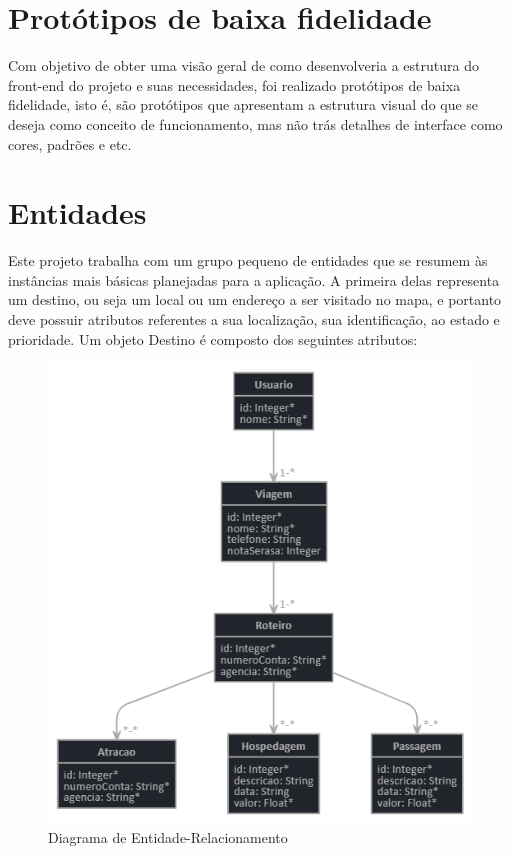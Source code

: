 \documentclass[cic,tc]{iiufrgs}
\begin{document}
\section{Protótipos de baixa fidelidade}
Com objetivo de obter uma visão geral de como desenvolveria a estrutura do front-end do projeto e suas necessidades, foi realizado protótipos de baixa fidelidade, isto é, são protótipos que apresentam a estrutura visual do que se deseja como conceito de funcionamento, mas não trás detalhes de interface como cores, padrões e etc.

\section{Entidades}
Este projeto trabalha com um grupo pequeno de entidades que se resumem às instâncias mais básicas planejadas para a aplicação. A primeira delas representa um destino, ou seja um local ou um endereço a ser visitado no mapa, e portanto deve possuir atributos
referentes a sua localização, sua identificação, ao estado e prioridade. Um objeto Destino
é composto dos seguintes atributos:
\begin{figure}[htp]
\centering
\includegraphics[width=15cm]{tcc/imagens/entidades.png}
\caption{Diagrama de Entidade-Relacionamento}
\label{fig:lion}
\end{figure}
\end{document}
